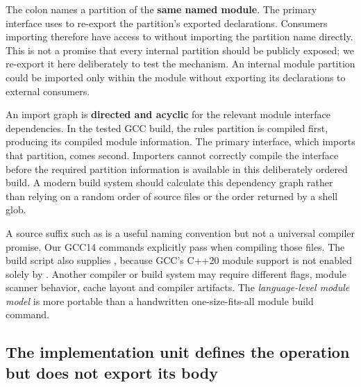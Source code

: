 The colon names a partition of the \textbf{same named module}. The primary interface uses  to re-export the partition's exported declarations. Consumers importing  therefore have access to  without importing the partition name directly. This is not a promise that every internal partition should be publicly exposed; we re-export it here deliberately to test the mechanism. An internal module partition could be imported only within the module without exporting its declarations to external consumers.

An import graph is \textbf{directed and acyclic} for the relevant module interface dependencies. In the tested GCC build, the rules partition is compiled first, producing its compiled module information. The primary interface, which imports that partition, comes second. Importers cannot correctly compile the interface before the required partition information is available in this deliberately ordered build. A modern build system should calculate this dependency graph rather than relying on a random order of source files or the order returned by a shell glob.

A source suffix such as  is a useful naming convention but not a universal compiler promise. Our GCC14 commands explicitly pass  when compiling those files. The build script also supplies , because GCC's C++20 module support is not enabled solely by . Another compiler or build system may require different flags, module scanner behavior, cache layout and compiler artifacts. The \emph{language-level module model} is more portable than a handwritten one-size-fits-all module build command.

\subsection{The implementation unit defines the operation but does not export its body}\label{05-engine-i-ch006-the-implementation-unit-defines-the-operation-but-does-not-export-its-body}

\hypertarget{05-engine-i-ch006-the-implementation-unit-defines-the-operation-but-does-not-export-its-body}{}

